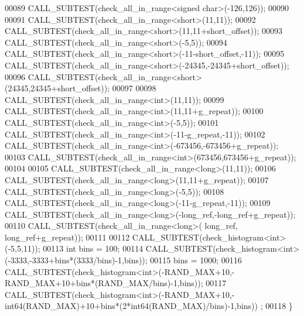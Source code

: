 \begin{DoxyCode}
00089   CALL\_SUBTEST(check\_all\_in\_range<signed char>(-126,126));
00090 
00091   CALL\_SUBTEST(check\_all\_in\_range<short>(11,11));
00092   CALL\_SUBTEST(check\_all\_in\_range<short>(11,11+short\_offset));
00093   CALL\_SUBTEST(check\_all\_in\_range<short>(-5,5));
00094   CALL\_SUBTEST(check\_all\_in\_range<short>(-11-short\_offset,-11));
00095   CALL\_SUBTEST(check\_all\_in\_range<short>(-24345,-24345+short\_offset));
00096   CALL\_SUBTEST(check\_all\_in\_range<short>(24345,24345+short\_offset));
00097 
00098   CALL\_SUBTEST(check\_all\_in\_range<int>(11,11));
00099   CALL\_SUBTEST(check\_all\_in\_range<int>(11,11+g\_repeat));
00100   CALL\_SUBTEST(check\_all\_in\_range<int>(-5,5));
00101   CALL\_SUBTEST(check\_all\_in\_range<int>(-11-g\_repeat,-11));
00102   CALL\_SUBTEST(check\_all\_in\_range<int>(-673456,-673456+g\_repeat));
00103   CALL\_SUBTEST(check\_all\_in\_range<int>(673456,673456+g\_repeat));
00104 
00105   CALL\_SUBTEST(check\_all\_in\_range<long>(11,11));
00106   CALL\_SUBTEST(check\_all\_in\_range<long>(11,11+g\_repeat));
00107   CALL\_SUBTEST(check\_all\_in\_range<long>(-5,5));
00108   CALL\_SUBTEST(check\_all\_in\_range<long>(-11-g\_repeat,-11));
00109   CALL\_SUBTEST(check\_all\_in\_range<long>(-long\_ref,-long\_ref+g\_repeat));
00110   CALL\_SUBTEST(check\_all\_in\_range<long>( long\_ref, long\_ref+g\_repeat));
00111 
00112   CALL\_SUBTEST(check\_histogram<int>(-5,5,11));
00113   \textcolor{keywordtype}{int} bins = 100;
00114   CALL\_SUBTEST(check\_histogram<int>(-3333,-3333+bins*(3333/bins)-1,bins));
00115   bins = 1000;
00116   CALL\_SUBTEST(check\_histogram<int>(-RAND\_MAX+10,-RAND\_MAX+10+bins*(RAND\_MAX/bins)-1,bins));
00117   CALL\_SUBTEST(check\_histogram<int>(-RAND\_MAX+10,-int64(RAND\_MAX)+10+bins*(2*int64(RAND\_MAX)/bins)-1,bins))
      ;
00118 \}
\end{DoxyCode}
